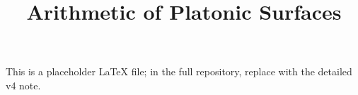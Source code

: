 \documentclass[11pt]{article}
\title{Arithmetic of Platonic Surfaces}
\date{}
\begin{document}
\maketitle
This is a placeholder LaTeX file; in the full repository, replace with the detailed v4 note.
\end{document}
